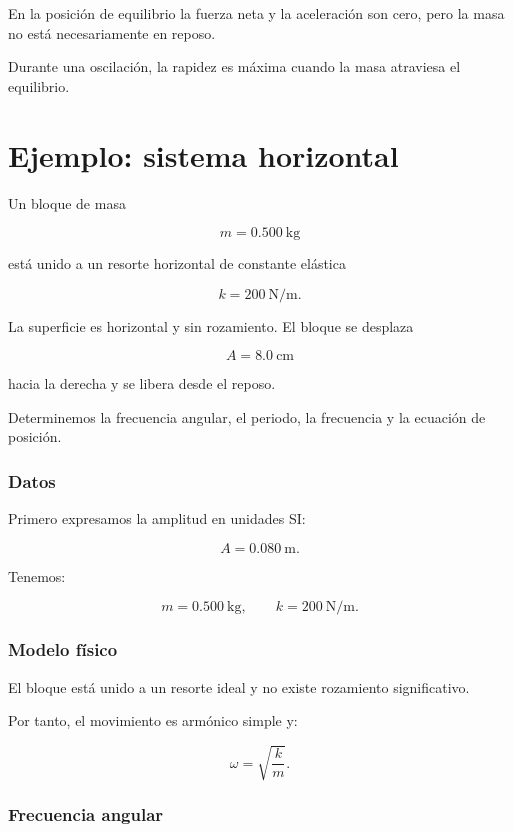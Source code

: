 \begin{errorfrecuente}
En la posición de equilibrio la fuerza neta y la aceleración son cero, pero la masa no está necesariamente en reposo.

Durante una oscilación, la rapidez es máxima cuando la masa atraviesa el equilibrio.
\end{errorfrecuente}


\section{Ejemplo: sistema horizontal}

\begin{ejemplo}
Un bloque de masa

\[ m=\SI{0.500}{\kilogram} \]

está unido a un resorte horizontal de constante elástica

\[ k=\SI{200}{\newton\per\meter}. \]

La superficie es horizontal y sin rozamiento. El bloque se desplaza

\[ A=\SI{8.0}{\centi\meter} \]

hacia la derecha y se libera desde el reposo.

Determinemos la frecuencia angular, el periodo, la frecuencia y la ecuación de posición.
\end{ejemplo}

\subsubsection*{Datos}

Primero expresamos la amplitud en unidades SI:

\[ A=\SI{0.080}{\meter}. \]

Tenemos:

\[
m=\SI{0.500}{\kilogram},
\qquad
k=\SI{200}{\newton\per\meter}.
\]

\subsubsection*{Modelo físico}

El bloque está unido a un resorte ideal y no existe rozamiento significativo.

Por tanto, el movimiento es armónico simple y:

\[ \omega=\sqrt{\frac{k}{m}}. \]

\subsubsection*{Frecuencia angular}

